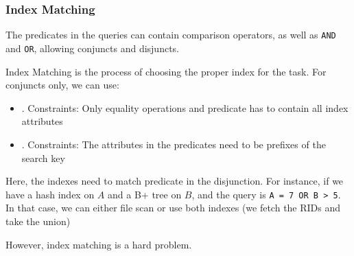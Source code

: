 \subsubsection{Index Matching}
The predicates in the queries can contain comparison operators, as well as \texttt{AND} and \texttt{OR}, allowing conjuncts and disjuncts.

Index Matching is the process of choosing the proper index for the task.
For conjuncts only, we can use:
\begin{itemize}
    \item {}. Constraints: Only equality operations and predicate has to contain all index attributes
    \item {}. Constraints: The attributes in the predicates need to be prefixes of the search key
\end{itemize}

Here, the indexes need to match  predicate in the disjunction.
For instance, if we have a hash index on $A$ and a B+ tree on $B$, and the query is \verb|A = 7 OR B > 5|.
In that case, we can either file scan or use both indexes (we fetch the RIDs and take the union)

However, index matching is a hard problem.
